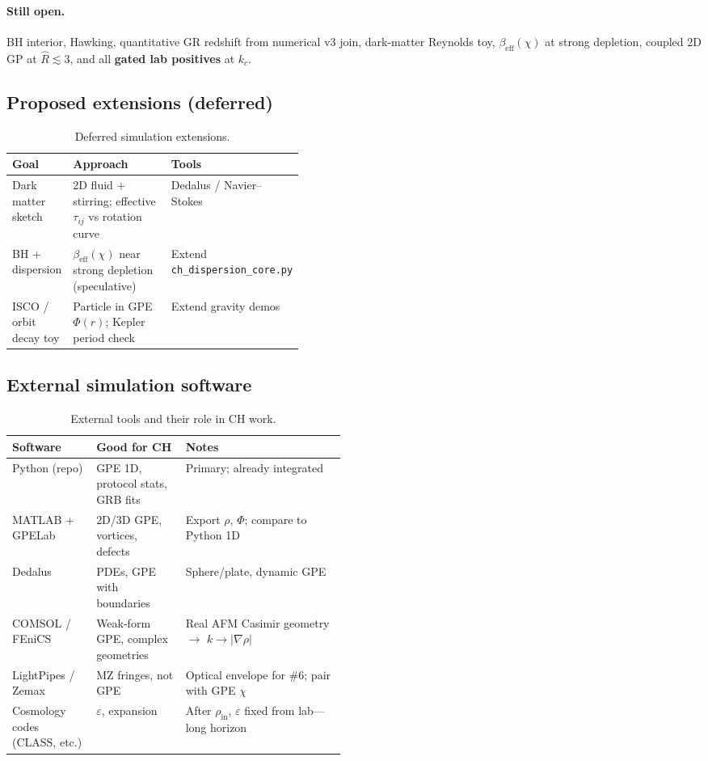 \documentclass[11pt,a4paper]{article}
\begin{document}
\paragraph{Still open.}
BH interior, Hawking, quantitative GR redshift from numerical v3 join, dark-matter Reynolds toy, $\beta_{\mathrm{eff}}(\chi)$ at strong depletion, coupled 2D GP at $\hat{R}\lesssim 3$, and all \textbf{gated lab positives} at $k_c$.

\subsection{Proposed extensions (deferred)}
\label{sec:sim-proposed}

\begin{table}[htbp]
  \centering
  \footnotesize
  \caption{Deferred simulation extensions.}
  \begin{tabular}{@{}lp{0.42\linewidth}l@{}}
    \toprule
    Goal & Approach & Tools \\
    \midrule
    Dark matter sketch & 2D fluid + stirring; effective $\tau_{ij}$ vs rotation curve & Dedalus / Navier--Stokes \\
    BH + dispersion & $\beta_{\mathrm{eff}}(\chi)$ near strong depletion (speculative) & Extend \texttt{ch\_dispersion\_core.py} \\
    ISCO / orbit decay toy & Particle in GPE $\Phi(r)$; Kepler period check & Extend gravity demos \\
    \bottomrule
  \end{tabular}
\end{table}

\subsection{External simulation software}

\begin{table}[htbp]
  \centering
  \small
  \caption{External tools and their role in CH work.}
  \begin{tabular}{@{}llp{0.48\linewidth}@{}}
    \toprule
    Software & Good for CH & Notes \\
    \midrule
    Python (repo) & GPE 1D, protocol stats, GRB fits & Primary; already integrated \\
    MATLAB + GPELab & 2D/3D GPE, vortices, defects & Export $\rho$, $\Phi$; compare to Python 1D \\
    Dedalus & PDEs, GPE with boundaries & Sphere/plate, dynamic GPE \\
    COMSOL / FEniCS & Weak-form GPE, complex geometries & Real AFM Casimir geometry $\to$ $k \to |\nabla\rho|$ \\
    LightPipes / Zemax & MZ fringes, not GPE & Optical envelope for \#6; pair with GPE $\chi$ \\
    Cosmology codes (CLASS, etc.) & $\varepsilon$, expansion & After $\rho_{\mathrm{in}}$, $\varepsilon$ fixed from lab---long horizon \\
    \bottomrule
  \end{tabular}
\end{table}
\end{document}

